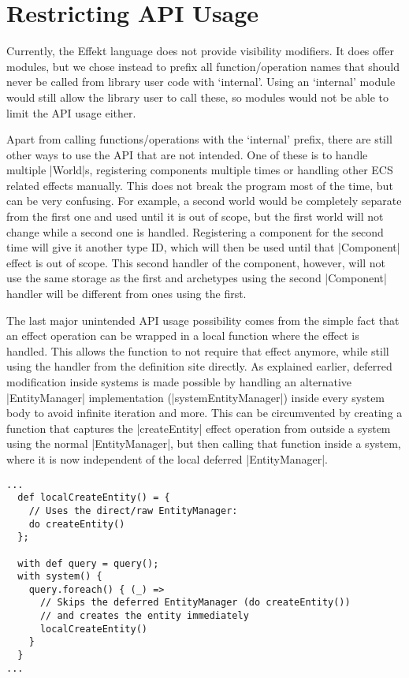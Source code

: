 \section{Restricting API Usage}

Currently, the Effekt language does not provide visibility modifiers. It does offer modules, but we chose instead to prefix all function/operation names that should never be called from library user code with `internal'. Using an `internal' module would still allow the library user to call these, so modules would not be able to limit the API usage either.

Apart from calling functions/operations with the `internal' prefix, there are still other ways to use the API that are not intended. One of these is to handle multiple |World|s, registering components multiple times or handling other ECS related effects manually. This does not break the program most of the time, but can be very confusing. For example, a second world would be completely separate from the first one and used until it is out of scope, but the first world will not change while a second one is handled. Registering a component for the second time will give it another type ID, which will then be used until that |Component| effect is out of scope. This second handler of the component, however, will not use the same storage as the first and archetypes using the second |Component| handler will be different from ones using the first.

The last major unintended API usage possibility comes from the simple fact that an effect operation can be wrapped in a local function where the effect is handled. This allows the function to not require that effect anymore, while still using the handler from the definition site directly. As explained earlier, deferred modification inside systems is made possible by handling an alternative |EntityManager| implementation (|systemEntityManager|) inside every system body to avoid infinite iteration and more. This can be circumvented by creating a function that captures the |createEntity| effect operation from outside a system using the normal |EntityManager|, but then calling that function inside a system, where it is now independent of the local deferred |EntityManager|.

\newsavebox{\localfunctionwrap}
\begin{lrbox}{\localfunctionwrap}
\begin{lstlisting}
...
  def localCreateEntity() = {
    // Uses the direct/raw EntityManager:
    do createEntity()
  };

  with def query = query();
  with system() {
    query.foreach() { (_) =>
	  // Skips the deferred EntityManager (do createEntity())
	  // and creates the entity immediately
      localCreateEntity()
    }
  }
...
\end{lstlisting}
\end{lrbox}

